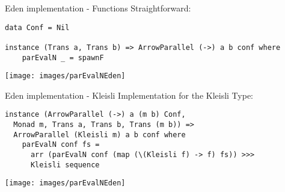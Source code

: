 \begin{frame}[fragile]{Eden implementation - Functions}
Straightforward:
\begin{lstlisting}[frame=htrbl]
data Conf = Nil

instance (Trans a, Trans b) => ArrowParallel (->) a b conf where
	parEvalN _ = spawnF
\end{lstlisting}
\begin{center}
\texttt{[image: images/parEvalNEden]}
\end{center}
\end{frame}

\begin{frame}[fragile]{Eden implementation - Kleisli}
Implementation for the Kleisli Type:
\begin{lstlisting}[frame=htrbl]
instance (ArrowParallel (->) a (m b) Conf,
  Monad m, Trans a, Trans b, Trans (m b)) =>
  ArrowParallel (Kleisli m) a b conf where
    parEvalN conf fs = 
      arr (parEvalN conf (map (\(Kleisli f) -> f) fs)) >>>
      Kleisli sequence
\end{lstlisting}
\begin{center}
\texttt{[image: images/parEvalNEden]}
\end{center}
\end{frame}